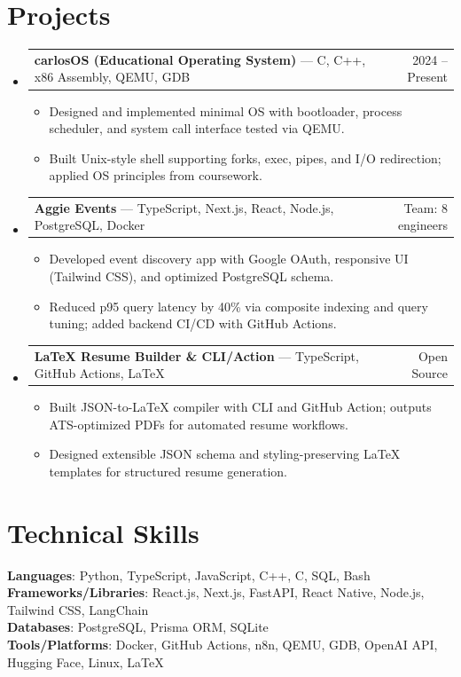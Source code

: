\documentclass[letterpaper,11pt]{article}
\makeatletter
\newcommand{\resumeItem}[1]{
  \item\small{{#1 \vspace{-2pt}}}
}
\newcommand{\resumeProjectHeading}[2]{
    \item
    \begin{tabular*}{0.97\textwidth}{l@{\extracolsep{\fill}}r}
      \small#1 & #2 \\
    \end{tabular*}\vspace{-7pt}
}
\newcommand{\resumeSubHeadingListStart}{\begin{itemize}[leftmargin=0.15in, label={}]}
\newcommand{\resumeSubHeadingListEnd}{\end{itemize}}
\newcommand{\resumeItemListStart}{\begin{itemize}}
\newcommand{\resumeItemListEnd}{\end{itemize}\vspace{-5pt}}
\makeatother
\begin{document}
\section{Projects}
\resumeSubHeadingListStart
  \resumeProjectHeading
    {\textbf{carlosOS (Educational Operating System)} — C, C++, x86 Assembly, QEMU, GDB}{2024 -- Present}
    \resumeItemListStart
      \resumeItem{Designed and implemented minimal OS with bootloader, process scheduler, and system call interface tested via QEMU.}
      \resumeItem{Built Unix-style shell supporting forks, exec, pipes, and I/O redirection; applied OS principles from coursework.}
    \resumeItemListEnd

  \resumeProjectHeading
    {\textbf{Aggie Events} — TypeScript, Next.js, React, Node.js, PostgreSQL, Docker}{Team: 8 engineers}
    \resumeItemListStart
      \resumeItem{Developed event discovery app with Google OAuth, responsive UI (Tailwind CSS), and optimized PostgreSQL schema.}
      \resumeItem{Reduced p95 query latency by 40\% via composite indexing and query tuning; added backend CI/CD with GitHub Actions.}
    \resumeItemListEnd

  \resumeProjectHeading
    {\textbf{LaTeX Resume Builder \& CLI/Action} — TypeScript, GitHub Actions, LaTeX}{Open Source}
    \resumeItemListStart
      \resumeItem{Built JSON-to-LaTeX compiler with CLI and GitHub Action; outputs ATS-optimized PDFs for automated resume workflows.}
      \resumeItem{Designed extensible JSON schema and styling-preserving LaTeX templates for structured resume generation.}
    \resumeItemListEnd
\resumeSubHeadingListEnd

\section{Technical Skills}
\begin{itemize}[leftmargin=0.15in, label={}]
  \small{\item{
    \textbf{Languages}{: Python, TypeScript, JavaScript, C++, C, SQL, Bash} \\
    \textbf{Frameworks/Libraries}{: React.js, Next.js, FastAPI, React Native, Node.js, Tailwind CSS, LangChain} \\
    \textbf{Databases}{: PostgreSQL, Prisma ORM, SQLite} \\
    \textbf{Tools/Platforms}{: Docker, GitHub Actions, n8n, QEMU, GDB, OpenAI API, Hugging Face, Linux, LaTeX}
  }}
\end{itemize}
\end{document}
